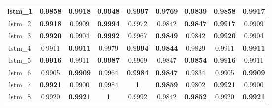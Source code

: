 \begin{table}[p]
\begin{tabular} {|c|c|c|c|c|c|c|c|c| }
        lstm\_1  & 0.9858                        & \textbf{0.9918}                     & 0.9948                         & \textbf{0.9997}                & 0.9769                     & \textbf{0.9839}                     & 0.9858                     & \textbf{0.9917}                     \\ \hline
        lstm\_2  & \textbf{0.9918}               & 0.9909                              & \textbf{0.9994}                & 0.9972                         & 0.9842                     & \textbf{0.9847}                     & \textbf{0.9917}            & 0.9909                              \\ \hline
        lstm\_3  & \textbf{0.9920}               & 0.9904                              & \textbf{0.9992}                & 0.9967                         & \textbf{0.9849}            & 0.9842                              & \textbf{0.9920}            & 0.9904                              \\ \hline
        lstm\_4  & 0.9911                        & \textbf{0.9911}                     & 0.9979                         & \textbf{0.9994}                & \textbf{0.9844}            & 0.9829                              & 0.9911                     & \textbf{0.9911}                     \\ \hline
        lstm\_5  & \textbf{0.9916}               & 0.9911                              & \textbf{0.9987}                & 0.9969                         & 0.9847                     & \textbf{0.9854}                     & \textbf{0.9916}            & 0.9911                              \\ \hline
        lstm\_6  & 0.9905                        & \textbf{0.9909}                     & 0.9964                         & \textbf{0.9984}                & \textbf{0.9847}            & 0.9834                              & 0.9905                     & \textbf{0.9909}                     \\ \hline
        lstm\_7  & \textbf{0.9921}               & 0.9900                              & 0.9984                         & \textbf{\cellcolor{green!50}1} & \textbf{0.9859}            & 0.9802                              & \textbf{0.9921}            & 0.9900                              \\ \hline
        lstm\_8  & 0.9920                        & \textbf{0.9921}                     & \textbf{\cellcolor{green!50}1} & 0.9992                         & 0.9842                     & \textbf{0.9852}                     & 0.9920                     & \textbf{0.9921}                     \\ \hline

\end{tabular}
\end{table}
